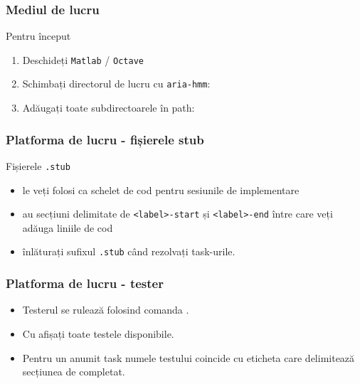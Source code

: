 \begin{frame}
  \frametitle{Mediul de lucru}
Pentru început
  \begin{enumerate}
  \item Deschideți \texttt{Matlab} / \texttt{Octave}
  \item Schimbați directorul de lucru cu \texttt{aria-hmm}:\\
  \item Adăugați toate subdirectoarele în path:\\
  \end{enumerate}
\end{frame}

\begin{frame}
  \frametitle{Platforma de lucru - fișierele stub}
  Fișierele \texttt{.stub}
  \begin{itemize}
  \item le veți folosi ca schelet de cod pentru sesiunile de implementare
  \item au secțiuni delimitate de \texttt{<label>-start} și \texttt{<label>-end}
    între care veți adăuga liniile de cod
  \item înlăturați sufixul \texttt{.stub} când rezolvați task-urile.
  \end{itemize}\vspace*{-1em}%
  
\end{frame}

\begin{frame}
  \frametitle{Platforma de lucru - tester}
  \begin{itemize}
    \item Testerul se rulează folosind comanda .
      
    \item Cu  afișați toate testele disponibile.
    \item Pentru un anumit task numele testului coincide cu eticheta care delimitează secțiunea de completat.
  \end{itemize}
\end{frame}
